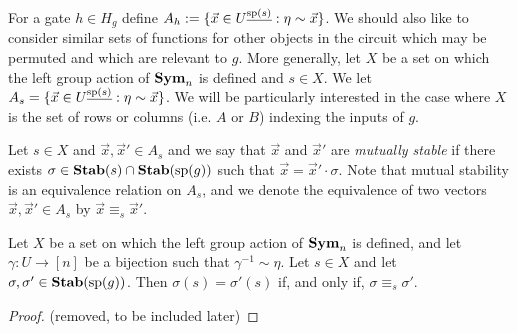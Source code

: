 \documentclass[../paper.tex]{subfiles}
\begin{document}

For a gate $h \in H_g$ define $A_h := \{\vec{x} \in U^{\underline{\text{sp}(s)}} :
\eta \sim \vec{x}\}$. We should also like to consider similar sets of functions
for other objects in the circuit which may be permuted and which are relevant to
$g$. More generally, let $X$ be a set on which the left group action of $\text{\textbf{Sym}}_n$
is defined and $s \in X$. We let $A_s = \{\vec{x} \in U^{\underline{\text{sp}(s)}}
: \eta \sim \vec{x}\}$. We will be particularly
interested in the case where $X$ is the set of rows or columns (i.e. $A$ or $B$)
indexing the inputs of $g$.


Let $s \in X$ and $\vec{x}, \vec{x}' \in A_s$ and we say that $\vec{x}$ and
$\vec{x}'$ are \emph{mutually stable} if there exists $\sigma \in \text{\textbf{Stab}}(s) \cap
\text{\textbf{Stab}} (\text{sp} (g))$ such that $\vec{x} = \vec{x}' \cdot \sigma$. Note that mutual
stability is an equivalence relation on $A_s$, and we denote the equivalence of
two vectors $\vec{x}, \vec{x}' \in A_s$ by $\vec{x} \equiv_s \vec{x}'$.

\begin{lem}
  Let $X$ be a set on which the left group action of $\text{\textbf{Sym}}_n$ is defined, and
  let $\gamma: U \rightarrow [n]$ be a bijection such that $\gamma^{-1} \sim
  \eta$. Let $s \in X$ and let $\sigma, \sigma' \in \text{\textbf{Stab}}(\text{sp}(g))$. Then
  $\sigma(s) = \sigma' (s)$ if, and only if, $\sigma \equiv_s \sigma'$.
  \label{lem:functions-well-defined}
\end{lem}

\begin{proof}
  (removed, to be included later)
\end{proof}


\end{document}
